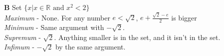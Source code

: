 \documentclass[10pt]{article} %
\begin{document}
\textbf{B} Set $\{x | x \in \mathbb{R} \mbox{ and } x^2 < 2\}$\\
\textit{Maximum} - None. For any number $e < \sqrt{2}$, $e + \frac{\sqrt{2}-e}{2}$ is bigger\\
\textit{Minimum} - Same argument with $-\sqrt{2}$.\\
\textit{Supremum} - $\sqrt{2}$. Anything smaller is in the set, and it isn't in the set.\\
\textit{Infimum} - $-\sqrt{2}$ by the same argument.\\
\end{document}
